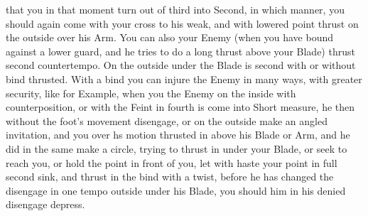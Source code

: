 that you in that moment turn out of third into Second, in which
manner, you should again come with your cross to his weak, and with
lowered point thrust on the outside over his Arm.
You can also your Enemy (when you have bound against a lower guard,
and he tries to do a long thrust above your Blade) thrust second
countertempo. On the outside under the Blade is second with or without
bind thrusted. With a bind you can injure the Enemy in many ways, with
greater security, like for Example, when you the Enemy on the inside
with counterposition, or with the Feint in fourth is come into Short measure,
he then without the foot's movement disengage, or on the outside make
an angled invitation, and you over hs motion thrusted in above his Blade
or Arm, and he did in the same make a circle,
trying to thrust in under your Blade, or seek to reach you, or hold
the point in front of you, let with haste your point in full second
sink, and thrust in the bind with a twist, before he has changed the
disengage in one tempo outside under his Blade, you should him in his
denied disengage depress.

